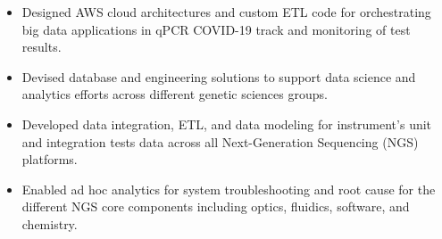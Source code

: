 \documentclass[10pt,a4paper]{altacv}
\begin{document}
\tagline{}

%

\begin{fullwidth}
\makecvheader
\end{fullwidth}

%





\begin{itemize}
    \item   \small{Designed AWS cloud architectures and custom ETL code for orchestrating big data applications in qPCR COVID-19 track and monitoring of test results.}
    \item   \small{Devised database and engineering solutions to support data science and analytics efforts across different genetic sciences groups.}
\end{itemize}

\medskip



\begin{itemize}
    \item   \small{Developed data integration, ETL, and data modeling for instrument's unit and integration tests data across all Next-Generation Sequencing (NGS) platforms.}
    \item   \small{Enabled ad hoc analytics for system troubleshooting and root cause for the different NGS core components including optics, fluidics, software, and chemistry.}
\end{itemize}
\end{document}
